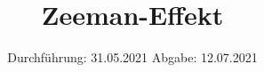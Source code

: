 

\subject{V27}
\title{Zeeman-Effekt}
\date{%
  Durchführung: 31.05.2021
  \hspace{3em}
  Abgabe: 12.07.2021
}



\maketitle
\thispagestyle{empty}
\tableofcontents
\newpage








\printbibliography{}


